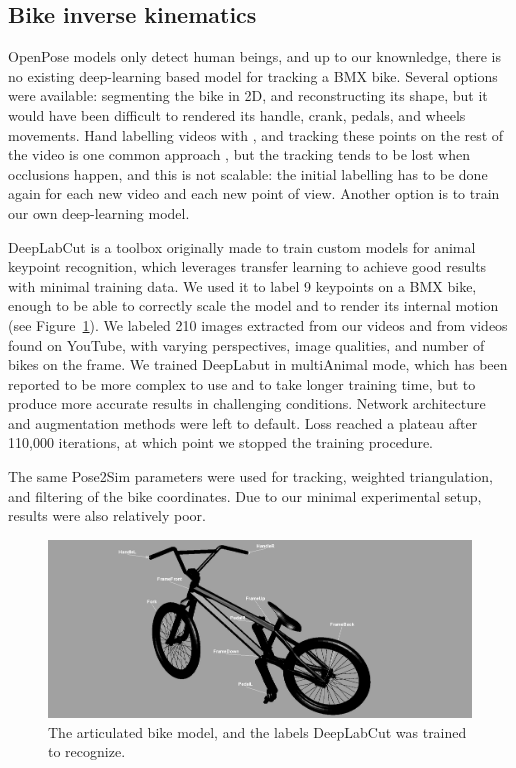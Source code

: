 \subsection{Bike inverse kinematics}

OpenPose models only detect human beings, and up to our knownledge, there is no existing deep-learning based model for tracking a BMX bike. Several options were available: segmenting the bike in 2D, and reconstructing its shape, but it would have been difficult to rendered its handle, crank, pedals, and wheels movements. Hand labelling videos with \cite{Kinovea}, and tracking these points on the rest of the video is one common approach \cite{Grigg2018}, but the tracking tends to be lost when occlusions happen, and this is not scalable: the initial labelling has to be done again for each new video and each new point of view. Another option is to train our own deep-learning model.

DeepLabCut \cite{Mathis2018, Lauer2022} is a toolbox originally made to train custom models for animal keypoint recognition, which leverages transfer learning to achieve good results with minimal training data. We used it to label 9 keypoints on a BMX bike, enough to be able to correctly scale the model and to render its internal motion (see Figure~\ref{fig_bikemodel}). We labeled 210 images extracted from our videos and from videos found on YouTube, with varying perspectives, image qualities, and number of bikes on the frame. We trained DeepLabut in multiAnimal mode, which has been reported to be more complex to use and to take longer training time, but to produce more accurate results in challenging conditions. Network architecture and augmentation methods were left to default. Loss reached a plateau after 110,000 iterations, at which point we stopped the training procedure.

The same Pose2Sim parameters were used for tracking, weighted triangulation, and filtering of the bike coordinates. Due to our minimal experimental setup, results were also relatively poor. %

\begin{figure}[hbtp]
	\centering
	\def\svgwidth{1\columnwidth}
	\fontsize{10pt}{10pt}\selectfont
	\includegraphics[width=\linewidth]{"../Chap7/Figures/Bike_keypoints.PNG"}
	\caption{The articulated bike model, and the labels DeepLabCut was trained to recognize.}
	\label{fig_bikemodel}
\end{figure}

